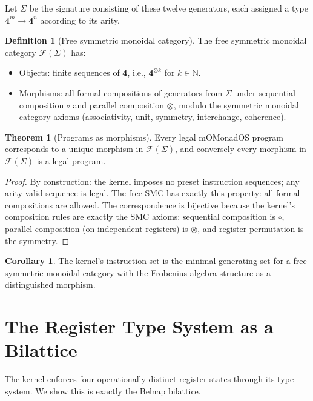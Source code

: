 \documentclass[11pt,a4paper]{article}
\theoremstyle{definition}
\newtheorem{definition}{Definition}[section]
\newtheorem{theorem}{Theorem}[section]
\newtheorem{corollary}{Corollary}[section]
\newcommand{\cat}[1]{\mathcal{#1}}
\begin{document}
Let $\Sigma$ be the signature consisting of these twelve generators, each assigned a type $\mathbf{4}^m \to \mathbf{4}^n$ according to its arity.

\begin{definition}[Free symmetric monoidal category]
The free symmetric monoidal category $\cat{F}(\Sigma)$ has:
\begin{itemize}
\item Objects: finite sequences of $\mathbf{4}$, i.e., $\mathbf{4}^{\otimes k}$ for $k \in \mathbb{N}$.
\item Morphisms: all formal compositions of generators from $\Sigma$ under sequential composition $\circ$ and parallel composition $\otimes$, modulo the symmetric monoidal category axioms (associativity, unit, symmetry, interchange, coherence).
\end{itemize}
\end{definition}

\begin{theorem}[Programs as morphisms]
Every legal mOMonadOS program corresponds to a unique morphism in $\cat{F}(\Sigma)$, and conversely every morphism in $\cat{F}(\Sigma)$ is a legal program.
\end{theorem}

\begin{proof}
By construction: the kernel imposes no preset instruction sequences; any arity-valid sequence is legal. The free SMC has exactly this property: all formal compositions are allowed. The correspondence is bijective because the kernel's composition rules are exactly the SMC axioms: sequential composition is $\circ$, parallel composition (on independent registers) is $\otimes$, and register permutation is the symmetry.
\end{proof}

\begin{corollary}
The kernel's instruction set is the minimal generating set for a free symmetric monoidal category with the Frobenius algebra structure as a distinguished morphism.
\end{corollary}

\section{The Register Type System as a Bilattice}

The kernel enforces four operationally distinct register states through its type system. We show this is exactly the Belnap bilattice.
\end{document}
